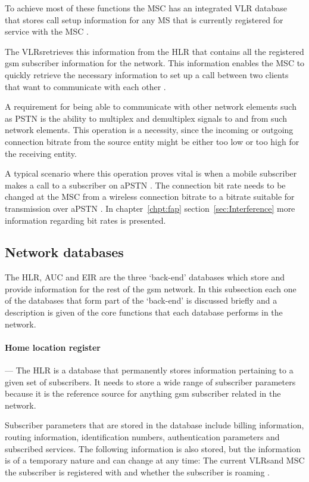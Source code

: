 To achieve most of these functions the \gls{MSC} has an integrated \gls{VLR} database that stores call setup information for any \gls{MS} that is currently registered for service with the \gls{MSC} \cite{GSM92,wirelesstelcoMullet}. 

The \glspl{VLR}retrieves this information from the \gls{HLR} that contains all the registered \gls{gsm} subscriber information for the network. This information enables the \gls{MSC} to quickly retrieve the necessary information to set up a call between two clients that want to communicate with each other \cite{GSMSysEngin,GSMSecurInTeleNetwork}.

A requirement for being able to communicate with other network elements such as \gls{PSTN} is the ability to multiplex and demultiplex signals to and from such network elements. This operation is a necessity, since the incoming or outgoing connection bitrate from the source entity might be either too low or too high for the receiving entity.

A typical scenario where this operation proves vital is when a mobile subscriber makes a call to a subscriber on a\gls{PSTN} \@. The connection bit rate needs to be changed at the \gls{MSC} from a wireless connection bitrate to a bitrate suitable for transmission over a\gls{PSTN} \@. In chapter~\ref{chpt:fap} section~\ref{sec:Interference} more information regarding bit rates is presented.

\subsection{Network databases}
The \gls{HLR},  \gls{AUC} and \gls{EIR} are the three `back-end' databases which store and provide information for the rest of the \gls{gsm} network. In this subsection each one of the databases that form part of the `back-end' is discussed briefly and a description is given of the core functions that each database performs in the network.

\paragraph{Home location register}
--- The \gls{HLR} is a database that permanently stores information pertaining to a given set of subscribers. It needs to store a wide range of subscriber parameters because it is the reference source for anything \gls{gsm} subscriber related in the network\cite{GSMSysEngin}. 

Subscriber parameters that are stored in the database include billing information, routing information, identification numbers, authentication parameters and subscribed services\cite{GSMSysEngin}. The following information is also stored, but the information is of a temporary nature and can change at any time: The current \glspl{VLR}and \gls{MSC} the subscriber is registered with and whether the subscriber is roaming \cite{GSMSysEngin}.

